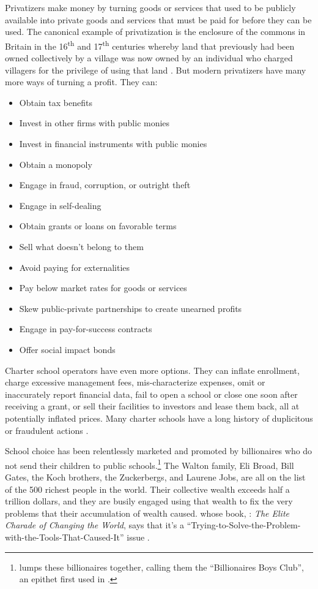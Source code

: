 Privatizers make money by turning goods or services that used to be publicly available into private goods and services that must be paid for before they can be used. The canonical example of privatization is the enclosure of the commons in Britain in the 16\textsuperscript{th} and 17\textsuperscript{th} centuries whereby land that previously had been owned collectively by a village was now owned by an individual who charged villagers for the privilege of using that land \parencite{SimonFairlie2009}. But modern privatizers have many more ways of turning a profit. They can:
\begin{itemize}
  \item Obtain tax benefits
  \item Invest in other firms with public monies
  \item Invest in financial instruments with public monies
  \item Obtain a monopoly
  \item Engage in fraud, corruption, or outright theft
  \item Engage in self-dealing
  \item Obtain grants or loans on favorable terms
  \item Sell what doesn't belong to them
  \item Avoid paying for externalities
  \item Pay below market rates for goods or services
  \item Skew public-private partnerships to create unearned profits
  \item Engage in pay-for-success contracts
  \item Offer social impact bonds
\end{itemize}

Charter school operators have even more options. They can inflate enrollment, charge excessive management fees, mis-characterize expenses, omit or inaccurately report financial data, fail to open a school or close one soon after receiving a grant, or sell their facilities to investors and lease them back, all at potentially inflated prices. Many charter schools have a long history of duplicitous or fraudulent actions \parencite{ITPT2018, Burris.Bryant2020, Baker.Miron2015}.

School choice has been relentlessly marketed and promoted by billionaires who do not send their children to public schools.\footnote{\textcite{Ravitch2010} lumps these billionaires together, calling them the ``Billionaires  Boys Club'', an epithet first used in .} The Walton family, Eli Broad, Bill Gates, the Koch brothers, the Zuckerbergs, and Laurene Jobs, are all on the list of the 500 richest people in the world. Their collective wealth exceeds half a trillion dollars, and they are busily engaged using that wealth to fix the very problems that their accumulation of wealth caused. \textcite{Giridharadas2018} whose book, : \textit{The Elite Charade of Changing the World}, says that it's a ``Trying-to-Solve-the-Problem-with-the-Tools-That-Caused-It'' issue \parencite[142]{Giridharadas2018}.

